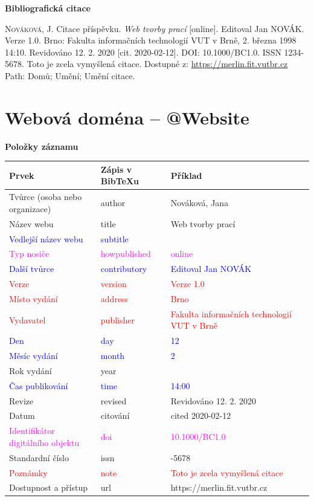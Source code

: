\bigskip

\noindent \textbf{Bibliografická citace}

\medskip

\noindent \textsc{Nováková}, J. Citace příspěvku. \textit{Web tvorby prací} [online]. Editoval Jan NOVÁK. Verze 1.0. Brno: Fakulta informačních technologií VUT v Brně, 2. března 1998 14:10. Revidováno 12. 2. 2020 [cit. 2020-02-12]. DOI: 10.1000/BC1.0. ISSN 1234-5678. Toto je zcela vymyšlená citace. Dostupné z: \url{https://merlin.fit.vutbr.cz} Path: Domů; Umění; Umění citace.
\newpage
\section*{Webová doména -- @Website}
\label{pr-website}
\noindent \textbf{Položky záznamu}

\medskip

\begin{tabularx}{0.95\linewidth}{>{\raggedright\arraybackslash}X X >{\raggedright\arraybackslash}X}
    Prvek & Zápis v BibTeXu & Příklad\\\hline
    Tvůrce (osoba nebo organizace) & author & Nováková, Jana\\
    Název webu & title & Web tvorby prací\\
    \textcolor{blue}{Vedlejší název webu} &  \textcolor{blue}{subtitle} & \\
    \textcolor{magenta}{Typ nosiče} & \textcolor{magenta}{howpublished} & \textcolor{magenta}{online}\\
    \textcolor{blue}{Další tvůrce} & \textcolor{blue}{contributory} & \textcolor{blue}{Editoval Jan NOVÁK}\\
    \textcolor{red}{Verze} & \textcolor{red}{version} & \textcolor{red}{Verze 1.0}\\
    \textcolor{red}{Místo vydání} & \textcolor{red}{address} & \textcolor{red}{Brno}\\
    \textcolor{red}{Vydavatel} & \textcolor{red}{publisher} & \textcolor{red}{Fakulta informačních technologií VUT v Brně}\\
    \textcolor{blue}{Den} & \textcolor{blue}{day} & \textcolor{blue}{12}\\
    \textcolor{blue}{Měsíc vydání} & \textcolor{blue}{month} & \textcolor{blue}{2}\\
    Rok vydání & year & 2020\\
    \textcolor{blue}{Čas publikování} & \textcolor{blue}{time} & \textcolor{blue}{14:00}\\
    Revize & revised & Revidováno 12. 2. 2020\\
    Datum & citování & cited 2020-02-12\\
    \textcolor{magenta}{Identifikátor digitálního objektu} & \textcolor{magenta}{doi} & \textcolor{magenta}{10.1000/BC1.0}\\
    Standardní číslo & issn & 1234-5678\\
    \textcolor{red}{Poznámky} & \textcolor{red}{note} & \textcolor{red}{Toto je zcela vymyšlená citace}\\
    Dostupnost a přístup & url & https://merlin.fit.vutbr.cz
\end{tabularx}

